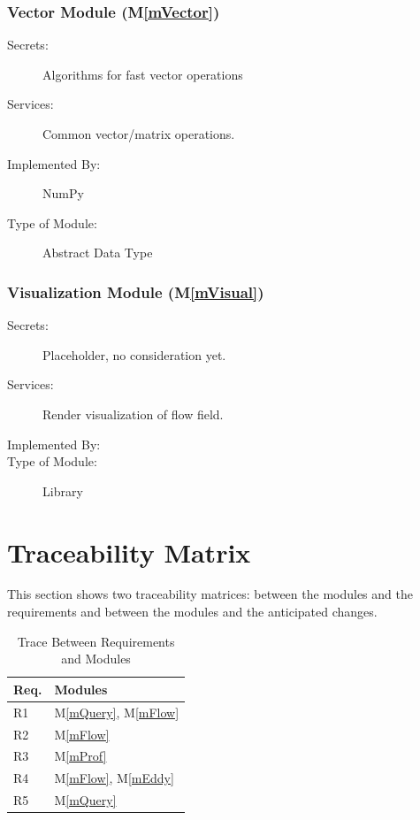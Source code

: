 \documentclass[12pt, titlepage]{article}
\newcommand{\mref}[1]{M\ref{#1}}
\begin{document}
\subsubsection{Vector Module (\mref{mVector})}
\begin{description}
\item[Secrets:]Algorithms for fast vector operations
\item[Services:]Common vector/matrix operations.
\item[Implemented By:] NumPy
\item[Type of Module:] Abstract Data Type
\end{description}

\subsubsection{Visualization Module (\mref{mVisual})}
\begin{description}
\item[Secrets:]Placeholder, no consideration yet.
\item[Services:]Render visualization of flow field.
\item[Implemented By:] \progname{}
\item[Type of Module:] Library
\end{description}

\section{Traceability Matrix} \label{SecTM}

This section shows two traceability matrices: between the modules and the
requirements and between the modules and the anticipated changes.

\begin{table}[H]
\centering
\begin{tabular}{p{} p{}}
\toprule
\textbf{Req.} & \textbf{Modules}\\
\midrule
R1 & \mref{mQuery}, \mref{mFlow}\\
R2 & \mref{mFlow}\\
R3 & \mref{mProf}\\
R4 & \mref{mFlow}, \mref{mEddy}\\
R5 & \mref{mQuery}\\
\bottomrule
\end{tabular}
\caption{Trace Between Requirements and Modules}
\label{TblRT}
\end{table}
\end{document}
